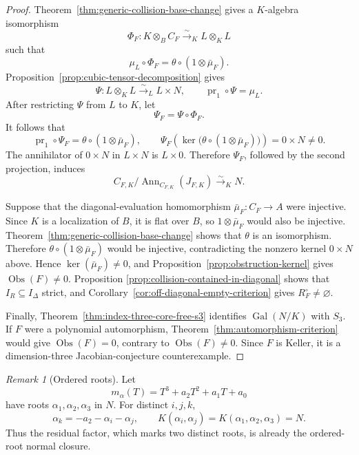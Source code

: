 \documentclass[11pt]{article}
\theoremstyle{remark}
\newtheorem*{remark}{Remark}
\theoremstyle{definition}
\DeclareMathOperator{\Gal}{Gal}
\DeclareMathOperator{\Ann}{Ann}
\newcommand{\Obs}{\operatorname{Obs}}
\begin{document}
\begin{proof}
Theorem~\ref{thm:generic-collision-base-change} gives a \(K\)-algebra
isomorphism
\[
  \Phi_F\colon K\otimes_BC_F\xrightarrow{\sim}_K L\otimes_KL
\]
such that
\[
  \mu_L\circ\Phi_F
  =
  \theta\circ(1\otimes\bar\mu_F).
\]
Proposition~\ref{prop:cubic-tensor-decomposition} gives
\[
  \Psi\colon L\otimes_KL\xrightarrow{\sim}_L L\times N,
  \qquad
  \operatorname{pr}_1\circ\Psi=\mu_L.
\]
After restricting \(\Psi\) from \(L\) to \(K\), let
\[
  \Psi_F=\Psi\circ\Phi_F.
\]
It follows that
\[
  \operatorname{pr}_1\circ\Psi_F
  =
  \theta\circ(1\otimes\bar\mu_F),
  \qquad
  \Psi_F\!\left(
    \ker\bigl(\theta\circ(1\otimes\bar\mu_F)\bigr)
  \right)
  =
  0\times N\neq0.
\]
The annihilator of \(0\times N\) in \(L\times N\) is \(L\times0\).
Therefore \(\Psi_F\), followed by the second projection, induces
\[
  C_{F,K}/\Ann_{C_{F,K}}(J_{F,K})\xrightarrow{\sim}_K N.
\]

Suppose that the diagonal-evaluation homomorphism
\(\bar\mu_F\colon C_F\to A\) were injective.  Since \(K\) is a
localization of \(B\), it is flat over
\(B\), so \(1\otimes\bar\mu_F\) would also be injective.
Theorem~\ref{thm:generic-collision-base-change} shows that \(\theta\)
is an isomorphism.  Therefore
\(\theta\circ(1\otimes\bar\mu_F)\) would be injective, contradicting
the nonzero kernel \(0\times N\) above.  Hence
\(\ker(\bar\mu_F)\neq0\), and
Proposition~\ref{prop:obstruction-kernel} gives
\(\Obs(F)\neq0\).  Proposition
\ref{prop:collision-contained-in-diagonal} shows that
\(I_R\subseteq I_\Delta\) strict, and
Corollary~\ref{cor:off-diagonal-empty-criterion} gives
\(R_F^\circ\neq\varnothing\).

Finally, Theorem~\ref{thm:index-three-core-free-s3} identifies
\(\Gal(N/K)\) with \(S_3\).  If \(F\) were a polynomial automorphism,
Theorem~\ref{thm:automorphism-criterion} would give
\(\Obs(F)=0\), contrary to \(\Obs(F)\neq0\).  Since \(F\) is Keller, it is
a dimension-three Jacobian-conjecture counterexample.
\end{proof}

\begin{remark}[Ordered roots]
Let
\[
  m_\alpha(T)=T^3+a_2T^2+a_1T+a_0
\]
have roots \(\alpha_1,\alpha_2,\alpha_3\) in \(N\).  For distinct
\(i,j,k\),
\[
  \alpha_k=-a_2-\alpha_i-\alpha_j,
  \qquad
  K(\alpha_i,\alpha_j)
  =
  K(\alpha_1,\alpha_2,\alpha_3)
  =
  N.
\]
Thus the residual factor, which marks two distinct roots, is already
the ordered-root normal closure.
\end{remark}
\end{document}
